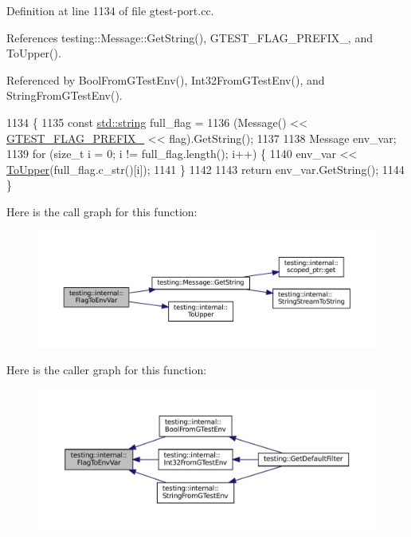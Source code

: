 Definition at line 1134 of file gtest-\/port.\+cc.



References testing\+::\+Message\+::\+Get\+String(), G\+T\+E\+S\+T\+\_\+\+F\+L\+A\+G\+\_\+\+P\+R\+E\+F\+I\+X\+\_\+, and To\+Upper().



Referenced by Bool\+From\+G\+Test\+Env(), Int32\+From\+G\+Test\+Env(), and String\+From\+G\+Test\+Env().


\begin{DoxyCode}
1134                                                 \{
1135   \textcolor{keyword}{const} \hyperlink{namespacetesting_1_1internal_a8e8ff5b11e64078831112677156cb111}{std::string} full\_flag =
1136       (Message() << \hyperlink{gtest-port_8h_a088e84784c589ba9b1fc48602ad8eabf}{GTEST\_FLAG\_PREFIX\_} << flag).GetString();
1137 
1138   Message env\_var;
1139   \textcolor{keywordflow}{for} (\textcolor{keywordtype}{size\_t} i = 0; i != full\_flag.length(); i++) \{
1140     env\_var << \hyperlink{namespacetesting_1_1internal_ac1b876a8133895bd553d4780ecaa1e3a}{ToUpper}(full\_flag.c\_str()[i]);
1141   \}
1142 
1143   \textcolor{keywordflow}{return} env\_var.GetString();
1144 \}
\end{DoxyCode}
Here is the call graph for this function\+:
\nopagebreak
\begin{figure}[H]
\begin{center}
\leavevmode
\includegraphics[width=350pt]{namespacetesting_1_1internal_a7540386ecf74d7ab7e2fa6089db94682_cgraph}
\end{center}
\end{figure}
Here is the caller graph for this function\+:
\nopagebreak
\begin{figure}[H]
\begin{center}
\leavevmode
\includegraphics[width=350pt]{namespacetesting_1_1internal_a7540386ecf74d7ab7e2fa6089db94682_icgraph}
\end{center}
\end{figure}
\mbox{\label{namespacetesting_1_1internal_a17b52b6b1f81f6dcad5cc4d12e5173a6}} 
